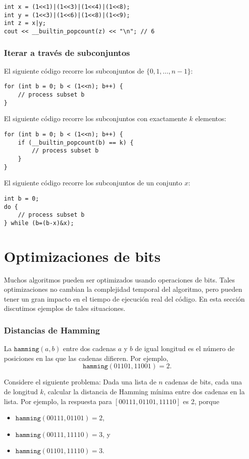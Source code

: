 \begin{lstlisting}
int x = (1<<1)|(1<<3)|(1<<4)|(1<<8);
int y = (1<<3)|(1<<6)|(1<<8)|(1<<9);
int z = x|y;
cout << __builtin_popcount(z) << "\n"; // 6
\end{lstlisting}

\subsubsection{Iterar a través de subconjuntos}

El siguiente código recorre
los subconjuntos de $\{0,1,\ldots,n-1\}$:



\begin{lstlisting}
for (int b = 0; b < (1<<n); b++) {
    // process subset b
}
\end{lstlisting}
El siguiente código recorre los subconjuntos con exactamente $k$ elementos:
\begin{lstlisting}
for (int b = 0; b < (1<<n); b++) {
    if (__builtin_popcount(b) == k) {
        // process subset b
    }
}
\end{lstlisting}
El siguiente código recorre los subconjuntos de un conjunto $x$:
\begin{lstlisting}
int b = 0;
do {
    // process subset b
} while (b=(b-x)&x);
\end{lstlisting}

\section{Optimizaciones de bits}

Muchos algoritmos pueden ser optimizados usando operaciones de bits.
Tales optimizaciones no cambian la complejidad temporal del algoritmo,
pero pueden tener un gran impacto en el tiempo de ejecución real del código.
En esta sección discutimos ejemplos de tales situaciones.

\subsubsection{Distancias de Hamming}

La  $\texttt{hamming}(a,b)$ entre dos cadenas $a$ y $b$ de igual longitud es el número de posiciones en las que las cadenas difieren.
Por ejemplo,
\[\texttt{hamming}(01101,11001)=2.\]

Considere el siguiente problema: Dada una lista de $n$ cadenas de bits, cada una de longitud $k$, calcular la distancia de Hamming mínima entre dos cadenas en la lista.
Por ejemplo, la respuesta para $[00111,01101,11110]$ es 2, porque
\begin{itemize}[noitemsep]
\item $\texttt{hamming}(00111,01101)=2$,
\item $\texttt{hamming}(00111,11110)=3$, y
\item $\texttt{hamming}(01101,11110)=3$.
\end{itemize}

